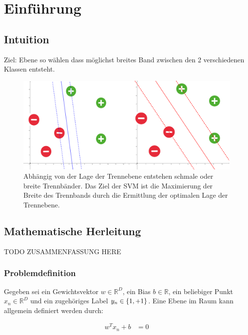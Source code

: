 \documentclass[a4paper,11pt,twoside]{scrreprt}
\begin{document}
\chapter{Einführung}

\section{Intuition}
Ziel: Ebene so wählen dass möglichst breites Band zwischen den 2 verschiedenen Klassen entsteht.


\begin{figure}[H]
	\centering
	\includegraphics[width = 16cm]{assets/small_vs_big_margin.png}
	\caption{Abhängig von der Lage der Trennebene entstehen schmale oder breite Trennbänder. Das Ziel der \ac{SVM} ist die Maximierung der Breite des Trennbands durch die Ermittlung der optimalen Lage der Trennebene.}
	\label{fig:intuition_margin}
\end{figure}


\section{Mathematische Herleitung}

TODO ZUSAMMENFASSUNG HERE

\subsection{Problemdefinition}
Gegeben sei ein Gewichtsvektor $w \in \mathbb{R}^{D}$, ein Bias $b \in \mathbb{R}$, ein beliebiger Punkt $x_{n} \in \mathbb{R}^{D}$ und ein zugehöriges Label $y_{n} \in \{\-1, +1\}$. Eine Ebene im Raum kann allgemein definiert werden durch:

\begin{equation} \label{plane_eq}
    \begin{aligned}
    w^{T} x_{n} + b &= 0 \\
    \end{aligned}
\end{equation}
\end{document}
